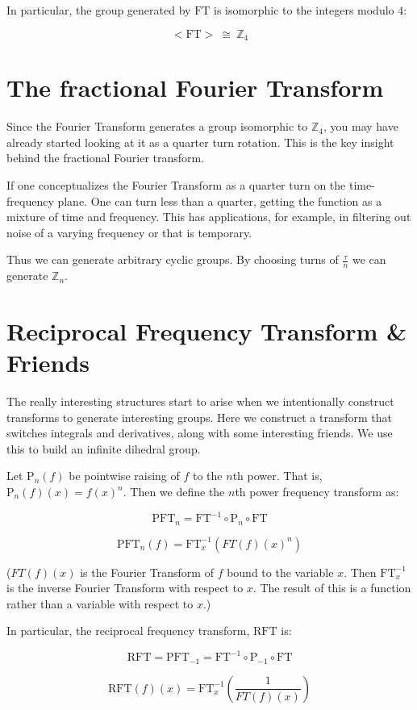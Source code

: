 \documentclass{article}
\newcommand{\RFT}{\text{RFT}}
\newcommand{\FT}{\text{FT}}
\newcommand{\PT}{\text{P}}
\newcommand{\PFT}{\text{PFT}}
\begin{document}
In particular, the group generated by $\FT$ is isomorphic to the integers modulo $4$:

$$<\!\FT\!> ~≅~ ℤ_4$$

\section{The fractional Fourier Transform}

Since the Fourier Transform generates a group isomorphic to $\mathbb{Z}_4$, you may have already started looking at it as a quarter turn rotation. This is the key insight behind the fractional Fourier transform.

If one conceptualizes the Fourier Transform as a quarter turn on the time-frequency plane. One can turn less than a quarter, getting the function as a mixture of time and frequency. This has applications, for example, in filtering out noise of a varying frequency or that is temporary.

Thus we can generate arbitrary cyclic groups. By choosing turns of $\frac{τ}{n}$ we can generate $ℤ_n$.

\section{Reciprocal Frequency Transform \& Friends}

The really interesting structures start to arise when we intentionally construct transforms to generate interesting groups. Here we construct a transform that switches integrals and derivatives, along with some interesting friends. We use this to build an infinite dihedral group. 

Let $\PT_n(f)$ be pointwise raising of $f$ to the $n$th power. That is, $ \PT_n(f)(x) = f(x)^n $. Then we define the $n$th power frequency transform as:

$$ \PFT_n = \FT^{-1} ∘ \PT_n ∘ \FT$$

$$ \PFT_n(f) = \FT^{-1}_x(FT(f)(x)^n)$$

($FT(f)(x)$ is the Fourier Transform of $f$ bound to the variable $x$. Then $\FT^{-1}_x$ is the inverse Fourier Transform with respect to $x$. The result of this is a function rather than a variable with respect to $x$.)

In particular, the reciprocal frequency transform, $\RFT$ is:

$$\RFT = \PFT_{-1} = \FT^{-1} ∘ \PT_{-1} ∘ \FT$$

$$\RFT(f)(x) = \FT^{-1}_x\left(\frac{1}{FT(f)(x)}\right)$$
\end{document}
